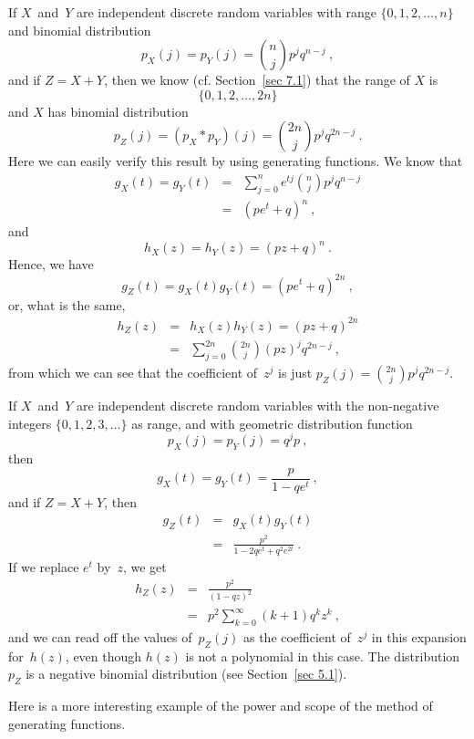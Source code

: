 \begin{example}\label{exam 10.5}
If $X$~and~$Y$ are independent discrete random variables with range
$\{0,1,2,\ldots,n\}$ and binomial distribution
$$
p_X(j) = p_Y(j) = {n \choose j} p^j q^{n - j}\ ,
$$
and if $Z = X + Y$, then we know (cf. Section~\ref{sec 7.1}) that the range of $X$ is
$$\{0,1,2,\ldots,2n\}$$ 
and $X$ has binomial distribution
$$
p_Z(j) = (p_X * p_Y)(j) =
{2n \choose j} p^j q^{2n - j}\ .
$$
Here we can easily verify this result by using generating functions.  We know
that
\begin{eqnarray*}
g_X(t) = g_Y(t) &=& \sum_{j = 0}^n e^{tj} {n \choose j} p^j q^{n - j} \\
       &=& (pe^t + q)^n\ ,
\end{eqnarray*}
and
$$
h_X(z) = h_Y(z) = (pz + q)^n\ .
$$
Hence, we have
$$
g_Z(t) = g_X(t) g_Y(t) = (pe^t + q)^{2n}\ ,
$$
or, what is the same,
\begin{eqnarray*}
h_Z(z) &=& h_X(z) h_Y(z) = (pz + q)^{2n} \\
       &=& \sum_{j = 0}^{2n} {2n \choose j} (pz)^j q^{2n - j}\ ,
\end{eqnarray*}
from which we can see that the coefficient of~$z^j$ is just $p_Z(j) =
{2n \choose j} p^j q^{2n - j}$.
\end{example}

\begin{example}\label{exam 10.6}
If $X$~and~$Y$ are independent discrete random variables with the non-negative 
integers $\{0,1,2,3,\ldots\}$ as range, and with geometric distribution function 
$$p_X(j) = p_Y(j) = q^j p\ ,$$ 
then
$$
g_X(t) = g_Y(t) = \frac p{1 - qe^t}\ ,
$$
and if $Z = X + Y$, then
\begin{eqnarray*}
g_Z(t) &=& g_X(t) g_Y(t) \\
       &=& \frac{p^2}{1 - 2qe^t + q^2 e^{2t}}\ .
\end{eqnarray*}
If we replace $e^t$ by~$z$, we get
\begin{eqnarray*}
h_Z(z) &=& \frac{p^2}{(1 - qz)^2} \\
       &=& p^2 \sum_{k = 0}^\infty (k + 1) q^k z^k\ ,
\end{eqnarray*}
and we can read off the values of~$p_Z(j)$ as the coefficient of~$z^j$ in this
expansion for~$h(z)$, even though $h(z)$ is not a polynomial in this case.  The
distribution $p_Z$ is a negative binomial distribution (see 
Section~\ref{sec 5.1}).
\end{example}

Here is a more interesting example of the power and scope of the method of
generating functions.

